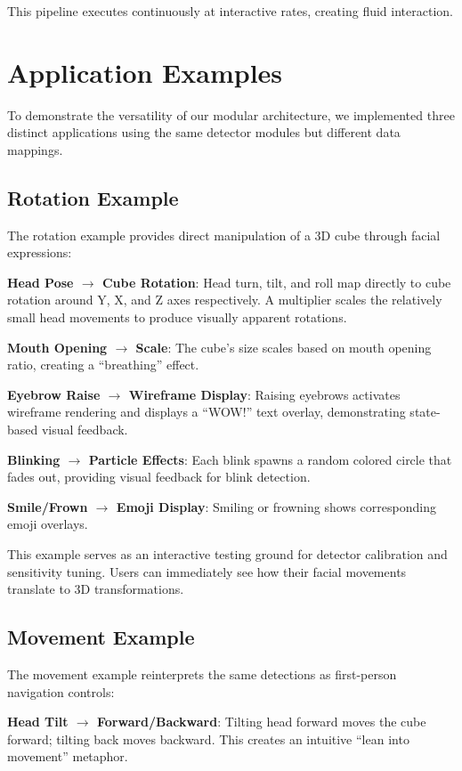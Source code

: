 \documentclass[sigconf]{acmart}
\begin{document}
This pipeline executes continuously at interactive rates, creating fluid interaction.

\section{Application Examples}
\label{sec:examples}

To demonstrate the versatility of our modular architecture, we implemented three distinct applications using the same detector modules but different data mappings.

\subsection{Rotation Example}

The rotation example provides direct manipulation of a 3D cube through facial expressions:

\textbf{Head Pose $\rightarrow$ Cube Rotation}: Head turn, tilt, and roll map directly to cube rotation around Y, X, and Z axes respectively. A multiplier scales the relatively small head movements to produce visually apparent rotations.

\textbf{Mouth Opening $\rightarrow$ Scale}: The cube's size scales based on mouth opening ratio, creating a ``breathing'' effect.

\textbf{Eyebrow Raise $\rightarrow$ Wireframe Display}: Raising eyebrows activates wireframe rendering and displays a ``WOW!'' text overlay, demonstrating state-based visual feedback.

\textbf{Blinking $\rightarrow$ Particle Effects}: Each blink spawns a random colored circle that fades out, providing visual feedback for blink detection.

\textbf{Smile/Frown $\rightarrow$ Emoji Display}: Smiling or frowning shows corresponding emoji overlays.

This example serves as an interactive testing ground for detector calibration and sensitivity tuning. Users can immediately see how their facial movements translate to 3D transformations.

\subsection{Movement Example}

The movement example reinterprets the same detections as first-person navigation controls:

\textbf{Head Tilt $\rightarrow$ Forward/Backward}: Tilting head forward moves the cube forward; tilting back moves backward. This creates an intuitive ``lean into movement'' metaphor.
\end{document}
